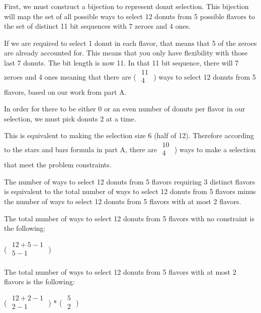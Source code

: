 \documentclass{6042}
\begin{document}
First, we must construct a bijection to represent donut selection. This bijection will map the set of all possible
ways to select 12 donuts from 5 possible flavors to the set of distinct 11 bit sequences with 7 zeroes and 4 ones.

If we are required to select 1 donut in each flavor, that means that 5 of the zeroes are already accounted for. This means that
you only have flexibility with those last 7 donuts. The bit length is now 11. In that 11 bit sequence, there will 7 zeroes and 4 ones
meaning that there are (
   \(
     {\begin{array}{c}
      11\\
      4\\
     \end{array} }
   \)
   )
ways to select 12 donuts from 5 flavors, based on our work from part A. 


In order for there to be either 0 or an even number of donuts per flavor in our selection, we must pick donuts 2 at a time.

This is equivalent to making the selection size 6 (half of 12). Therefore according to the stars and bars formula in part A,
there are \(
   {\begin{array}{c}
    10\\
    4\\
   \end{array} }
 \)
 )
ways to make a selection that meet the problem constraints. 


The number of ways to select 12 donuts from 5 flavors requiring 3 distinct flavors is equivalent to the total 
number of ways to select 12 donuts from 5 flavors minus the number of ways to select 12 donuts from 5 flavors with at most 2 flavors.

The total number of ways to select 12 donuts from 5 flavors with no constraint is the following:

(
\(
  {\begin{array}{c}
   12+5-1\\
   5-1\\
  \end{array} }
\)
)

The total number of ways to select 12 donuts from 5 flavors with at most 2 flavors is the following:

(
\(
  {\begin{array}{c}
   12+2-1\\
   2-1\\
  \end{array} }
\)
)
*
(
\(
  {\begin{array}{c}
   5\\
   2\\
  \end{array} }
\)
)
\end{document}

